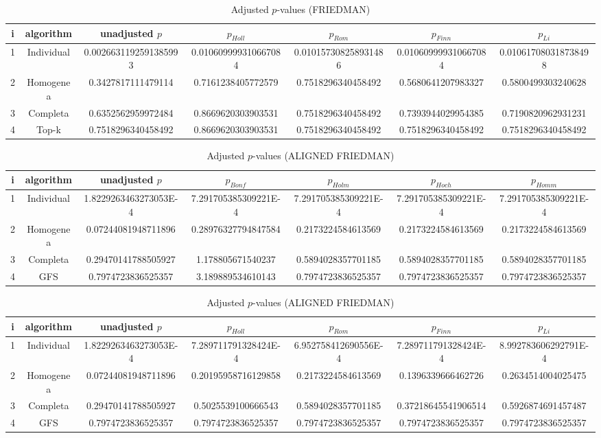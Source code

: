 \documentclass[a4paper,10pt]{article}
\begin{document}
\begin{landscape}
\begin{table}[!htp]
\centering\scriptsize
\caption{Adjusted $p$-values (FRIEDMAN)}
\begin{tabular}{ccccccc}
i&algorithm&unadjusted $p$&$p_{Holl}$&$p_{Rom}$&$p_{Finn}$&$p_{Li}$\\
\hline
1&Individual&0.0026631192591385993&0.010609999310667084&0.010157308258931486&0.010609999310667084&0.010617080318738498\\
2&Homogenea&0.3427817111479114&0.7161238405772579&0.7518296340458492&0.5680641207983327&0.5800499303240628\\
3&Completa&0.6352562959972484&0.8669620303903531&0.7518296340458492&0.7393944029954385&0.7190820962931231\\
4&Top-k&0.7518296340458492&0.8669620303903531&0.7518296340458492&0.7518296340458492&0.7518296340458492\\
\hline
\end{tabular}
\end{table}


\newpage

\begin{table}[!htp]
\centering\scriptsize
\caption{Adjusted $p$-values (ALIGNED FRIEDMAN)}
\begin{tabular}{ccccccc}
i&algorithm&unadjusted $p$&$p_{Bonf}$&$p_{Holm}$&$p_{Hoch}$&$p_{Homm}$\\
\hline
1&Individual&1.8229263463273053E-4&7.291705385309221E-4&7.291705385309221E-4&7.291705385309221E-4&7.291705385309221E-4\\
2&Homogenea&0.07244081948711896&0.28976327794847584&0.2173224584613569&0.2173224584613569&0.2173224584613569\\
3&Completa&0.29470141788505927&1.178805671540237&0.5894028357701185&0.5894028357701185&0.5894028357701185\\
4&GFS&0.7974723836525357&3.189889534610143&0.7974723836525357&0.7974723836525357&0.7974723836525357\\
\hline
\end{tabular}
\end{table}

\begin{table}[!htp]
\centering\scriptsize
\caption{Adjusted $p$-values (ALIGNED FRIEDMAN)}
\begin{tabular}{ccccccc}
i&algorithm&unadjusted $p$&$p_{Holl}$&$p_{Rom}$&$p_{Finn}$&$p_{Li}$\\
\hline
1&Individual&1.8229263463273053E-4&7.289711791328424E-4&6.952758412690556E-4&7.289711791328424E-4&8.992783606292791E-4\\
2&Homogenea&0.07244081948711896&0.20195958716129858&0.2173224584613569&0.1396339666462726&0.2634514004025475\\
3&Completa&0.29470141788505927&0.5025539100666543&0.5894028357701185&0.37218645541906514&0.5926874691457487\\
4&GFS&0.7974723836525357&0.7974723836525357&0.7974723836525357&0.7974723836525357&0.7974723836525357\\
\hline
\end{tabular}
\end{table}



\end{landscape}
\end{document}
